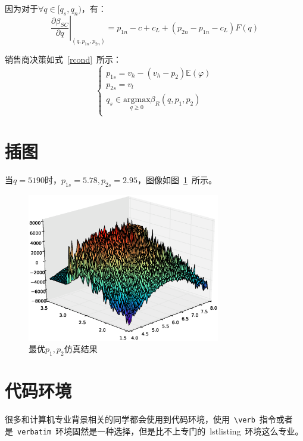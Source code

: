 \documentclass{csexp}
\begin{document}
因为对于$\forall q\in[q_s, q_n)$，有：
\[ \left.\frac{\partial \beta_{SC}}{\partial q}\right|_{(q,p_{1n},p_{2n})}=p_{1n}-c+c_L+(p_{2n}-p_{1n}-c_L)F(q) \]

销售商决策如式~\eqref{rcond}~所示：
\begin{equation}
    \label{rcond}
    \left\{\begin{array}{l}
        p_{1s}=v_h-(v_h-p_2)\mathbb{E}(\varphi)                            \\
        p_{2s}=v_l                                                         \\
        q_s \in \underset{q \geq 0}{\mathrm{argmax}} \beta_R (q, p_1, p_2) \\
    \end{array}\right.
\end{equation}

\section{插图}

当$q=5190$时，$p_{1s}=5.78,p_{2s}=2.95$，图像如图~\ref{fig:simuP1P2Result}~所示。
\begin{figure}[htbp!]
    \centering
    \includegraphics[width=0.75\textwidth]{figures/p1p2figure.eps}
    \caption{最优$p_1, p_2$仿真结果}\label{fig:simuP1P2Result}
    \vspace{-1em}
\end{figure}

\section{代码环境}

很多和计算机专业背景相关的同学都会使用到代码环境，使用~\verb|\verb|~指令或者是~\verb|verbatim|~环境固然是一种选择，但是比不上专门的~lstlisting~环境这么专业。
\end{document}

